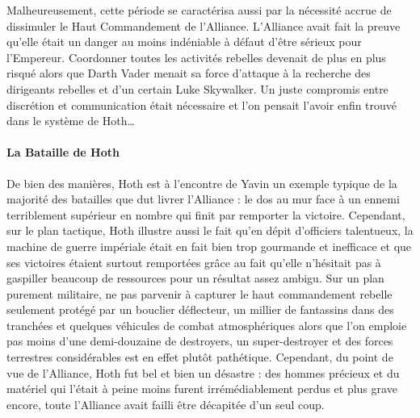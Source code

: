 \documentclass[twoside]{article}
\begin{document}
Malheureusement, cette période se caractérisa aussi par la nécessité accrue de dissimuler le Haut Commandement de l'Alliance. L'Alliance avait fait la preuve qu'elle était un danger au moins indéniable à défaut d'être sérieux pour l'Empereur. Coordonner toutes les activités rebelles devenait de plus en plus risqué alors que Darth Vader menait sa force d'attaque à la recherche des dirigeants rebelles et d'un certain Luke Skywalker. Un juste compromis entre discrétion et communication était nécessaire et l'on pensait l'avoir enfin trouvé dans le système de Hoth\ldots

\paragraph{La Bataille de Hoth}
De bien des manières, Hoth est à l'encontre de Yavin un exemple typique de la majorité des batailles que dut livrer l'Alliance : le dos au mur face à un ennemi terriblement supérieur en nombre qui finit par remporter la victoire. Cependant, sur le plan tactique, Hoth illustre aussi le fait qu'en dépit d'officiers talentueux, la machine de guerre impériale était en fait bien trop gourmande et inefficace et que ses victoires étaient surtout remportées grâce au fait qu'elle n'hésitait pas à gaspiller beaucoup de ressources pour un résultat assez ambigu. Sur un plan purement militaire, ne pas parvenir à capturer le haut commandement rebelle seulement protégé par un bouclier déflecteur, un millier de fantassins dans des tranchées et quelques véhicules de combat atmosphériques alors que l'on emploie pas moins d'une demi-douzaine de destroyers, un super-destroyer et des forces terrestres considérables est en effet plutôt pathétique. Cependant, du point de vue de l'Alliance, Hoth fut bel et bien un désastre : des hommes précieux et du matériel qui l'était à peine moins furent irrémédiablement perdus et plus grave encore, toute l'Alliance avait failli être décapitée d'un seul coup.
\end{document}

